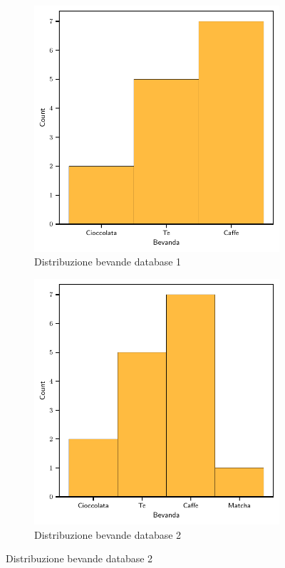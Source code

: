 \begin{figure}[H]
    \begin{subfigure}[t]{.5\textwidth}
        \centering
        \includegraphics[width=.8\linewidth]{plots/drink_histogram_no_matcha.pdf}
        \caption{Distribuzione bevande database 1}
    \end{subfigure}
    \begin{subfigure}[t]{.5\textwidth}
        \centering
        \includegraphics[width=.8\linewidth]{plots/drink_histogram_yes_matcha.pdf}
        \caption{Distribuzione bevande database 2}
    \end{subfigure}
\end{figure}

